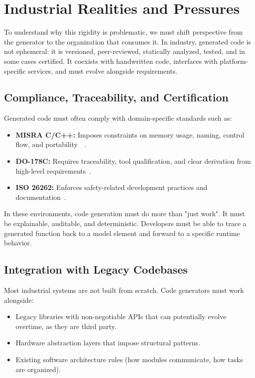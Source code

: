 \section{Industrial Realities and Pressures}
\label{sec:industrial_realities}

To understand why this rigidity is problematic, we must shift perspective from the generator to the organization that consumes it. In industry, generated code is not ephemeral: it is versioned, peer-reviewed, statically analyzed, tested, and in some cases certified. It coexists with handwritten code, interfaces with platform-specific services, and must evolve alongside requirements.

\subsection*{Compliance, Traceability, and Certification}

Generated code must often comply with domain-specific standards such as:

\begin{itemize}
	\item \textbf{\gls{MISRA} C/C++:} Imposes constraints on memory usage, naming, control flow, and portability~\cite{Misra_C_2025}~\cite{Misra_Cpp_2023}.
	\item \textbf{DO-178C:} Requires traceability, tool qualification, and clear derivation from high-level requirements~\cite{DO}. 
	\item \textbf{\gls{ISO} 26262:} Enforces safety-related development practices and documentation~\cite{Debouk_2019}.
\end{itemize} 

In these environments, code generation must do more than "just work". It must be explainable, auditable, and deterministic. Developers must be able to trace a generated function back to a model element and forward to a specific runtime behavior.

\subsection*{Integration with Legacy Codebases}

Most industrial systems are not built from scratch. Code generators must work alongside:

\begin{itemize}
	\item Legacy libraries with non-negotiable \gls{API}s that can potentially evolve overtime, as they are third party.
	\item Hardware abstraction layers that impose structural patterns.
	\item Existing software architecture rules (how modules communicate, how tasks are organized).
\end{itemize}

